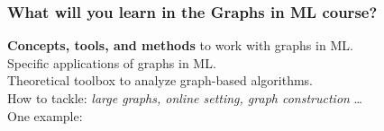 \documentclass{beamer}
\begin{document}



\begin{frame}

\frametitle{\textbf{What will you learn in the Graphs in ML course?}}

\textbf{Concepts, tools, and methods} to work with graphs in ML.  \\[2em]

\pause Specific applications of graphs in ML. \\[2em]

\pause Theoretical toolbox to analyze graph-based algorithms.\\[2em]

\pause How to tackle: \emph{large graphs, online setting, graph construction} \dots  \\[2em]

\pause One example:  

\end{frame}
\end{document}
